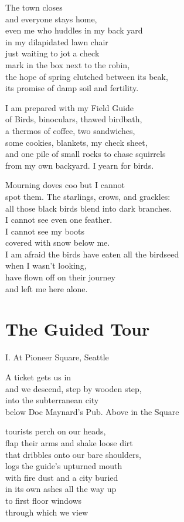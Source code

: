 \documentclass[twoside,10pt]{book}
\begin{document}
The town closes\\
and everyone stays home,\\
even me who huddles in my back yard\\
in my dilapidated lawn chair\\
just waiting to jot a check\\
mark in the box next to the robin,\\
the hope of spring clutched between its beak,\\
its promise of damp soil and fertility.

I am prepared with my Field Guide\\
of Birds, binoculars, thawed birdbath,\\
a thermos of coffee, two sandwiches,\\
some cookies, blankets, my check sheet,\\
and one pile of small rocks to chase squirrels\\
from my own backyard. I yearn for birds.

Mourning doves coo but I cannot\\
spot them. The starlings, crows, and grackles:\\
all those black birds blend into dark branches.\\
I cannot see even one feather.\\
I cannot see my boots\\
covered with snow below me.\\
I am afraid the birds have eaten all the birdseed\\
when I wasn't looking,\\
have flown off on their journey\\
and left me here alone.


\clearpage
\section{The Guided Tour}

I.  At Pioneer Square, Seattle

A ticket gets us in\\
and we descend, step by wooden step,\\
into the subterranean city\\
below Doc Maynard's Pub. Above in the Square

tourists perch on our heads,\\
flap their arms and shake loose dirt\\
that dribbles onto our bare shoulders,\\
logs the guide's upturned mouth\\
with fire dust and a city buried\\
in its own ashes all the way up\\
to first floor windows\\
through which we view
\end{document}
